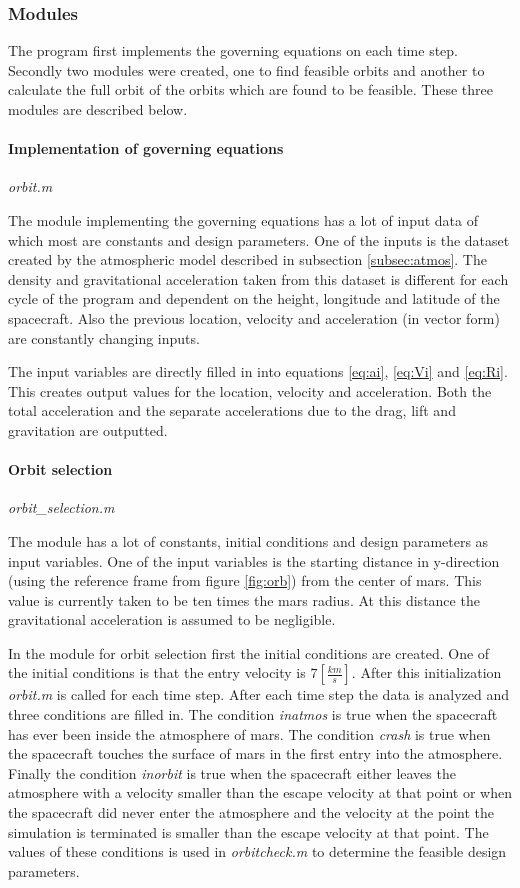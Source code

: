 \subsubsection{Modules} \label{subsec:modules}

The program first implements the governing equations on each time step. Secondly two modules were created, one to find feasible orbits and another to calculate the full orbit of the orbits which are found to be feasible. These three modules are described below.

\paragraph{Implementation of governing equations}\textit{orbit.m}

The module implementing the governing equations has a lot of input data of which most are constants and design parameters. One of the inputs is the dataset created by the atmospheric model described in subsection \ref{subsec:atmos}. The density and gravitational acceleration taken from this dataset is different for each cycle of the program and dependent on the height, longitude and latitude of the spacecraft. Also the previous location, velocity and acceleration (in vector form) are constantly changing inputs.

The input variables are directly filled in into equations \ref{eq:ai}, \ref{eq:Vi} and \ref{eq:Ri}. This creates output values for the location, velocity and acceleration. Both the total acceleration and the separate accelerations due to the drag, lift and gravitation are outputted.
\paragraph{Orbit selection} \textit{orbit\_selection.m}

The module has a lot of constants, initial conditions and design parameters as input variables. One of the input variables is the starting distance in y-direction (using the reference frame from figure \ref{fig:orb}) from the center of mars. This value is currently taken to be ten times the mars radius. At this distance the gravitational acceleration is assumed to be negligible. 

In the module for orbit selection first the initial conditions are created. One of the initial conditions is that the entry velocity is $7 [\frac{km}{s}]$. After this initialization \textit{orbit.m} is called for each time step. After each time step the data is analyzed and three conditions are filled in. The condition \textit{inatmos} is true when the spacecraft has ever been inside the atmosphere of mars. The condition \textit{crash} is true when the spacecraft touches the surface of mars in the first entry into the atmosphere. Finally the condition \textit{inorbit} is true when the spacecraft either leaves the atmosphere with a velocity smaller than the escape velocity at that point or when the spacecraft did never enter the atmosphere and the velocity at the point the simulation is terminated is smaller than the escape velocity at that point. The values of these conditions is used in \textit{orbitcheck.m} to determine the feasible design parameters.

